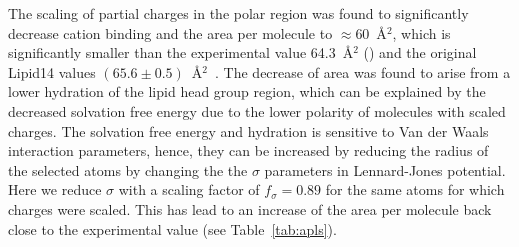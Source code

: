 \documentclass[aip,jcp,twocolumn]{revtex4}
\begin{document}
The scaling of partial charges in the polar region was found to 
significantly decrease cation binding and
the area per molecule to $\approx$60~\AA$^2$, which is significantly smaller than the
experimental value 64.3~\AA$^2$ (\cite{}) and the original Lipid14 values $(65.6 \pm 0.5)$~\AA$^2$~\cite{dickson14}.
The decrease of area was found to arise from a lower hydration of the lipid head group region,
which can be explained by the decreased solvation free energy due to the lower polarity
of molecules with scaled charges. 
The solvation free energy and hydration is sensitive to Van der Waals interaction parameters,
hence, they can be increased by reducing the radius of the selected atoms by changing the 
the $\sigma$ parameters in Lennard-Jones potential. 
Here we reduce $\sigma$ with a scaling factor of $f_\sigma = 0.89$ for the same atoms for which
charges were scaled. This has lead to an increase of the area per molecule back
close to the experimental value (see Table~\ref{tab:apls}). 
\end{document}
